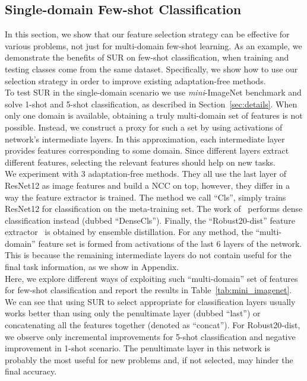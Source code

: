 \documentclass[runningheads]{llncs}
\begin{document}
\subsection{Single-domain Few-shot Classification}
In this section, we show that our feature selection strategy can be effective
for various problems, not just for multi-domain few-shot learning. As an
example, we demonstrate the benefits of SUR on few-shot classification,
when training and testing classes come from the same dataset. Specifically,
we show how to use our selection strategy in order to improve existing
adaptation-free methods.
\\
To test SUR in the single-domain scenario we use
\textit{mini}-ImageNet benchmark and solve 1-shot and 5-shot classification, as
described in Section~\ref{sec:details}.
When only one domain is available, obtaining a truly multi-domain set of features is not possible.
Instead, we construct a proxy for such a set by using
activations of network's intermediate layers. In this approximation, each intermediate
layer provides features corresponding to some domain. Since different layers
extract different features, selecting the relevant features should help on new
tasks.
\\
We experiment with 3 adaptation-free methods. They all use the last layer of
ResNet12 as image features and build a NCC on top, however, they differ in a way the
feature extractor is trained. The method we call ``Cls'', simply trains ResNet12
for classification on the meta-training set. The work
of~\cite{lifchitz2019dense} performs dense classification instead (dubbed
``DenseCls''). Finally, the ``Robust20-dist'' feature
extractor~\cite{dvornik2019diversity} is obtained by ensemble distillation.
For any method, the ``multi-domain'' feature set is formed from activations
of the last 6 layers of the network. This is because the remaining intermediate
layers do not contain useful for the final task information, as we show in
Appendix.
\\
Here, we explore different ways of exploiting such ``multi-domain'' set of
features for few-shot classification and report the results in
Table~\ref{tab:mini_imagenet}. We can see that using SUR to select appropriate
for classification layers usually works better than using only
the penultimate layer (dubbed ``last'') or concatenating all the features
together (denoted as ``concat''). For Robust20-dist, we observe only incremental
improvements for 5-shot classification and negative improvement in 1-shot
scenario. The penultimate layer in this network
is probably the most useful for new problems and, if not selected, may hinder
the final accuracy.
\end{document}

